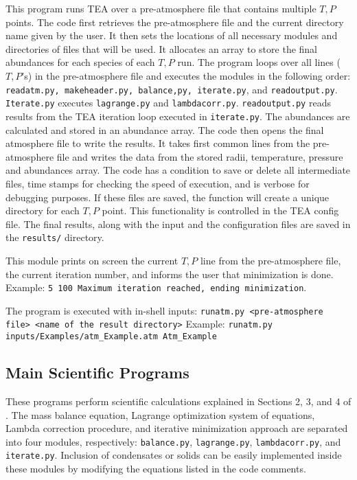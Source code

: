 This program runs TEA over a pre-atmosphere file that contains
multiple ${T,P}$ points.  The code first retrieves the pre-atmosphere
file and the current directory name given by the user. It then sets
the locations of all necessary modules and directories of files that
will be used. It allocates an array to store the final abundances for
each species of each $T, P$ run. The program loops over all lines
(${T, P}$'s) in the pre-atmosphere file and executes the modules in
the following order: \texttt{readatm.py, makeheader.py, balance,py,
iterate.py}, and \texttt{readoutput.py}. \texttt{Iterate.py}
executes \texttt{lagrange.py}
and \texttt{lambdacorr.py}. \texttt{readoutput.py} reads results from
the TEA iteration loop executed in \texttt{iterate.py}. The abundances
are calculated and stored in an abundance array. The code then opens
the final atmosphere file to write the results. It takes first common
lines from the pre-atmosphere file and writes the data from the stored
radii, temperature, pressure and abundances array. The code has a
condition to save or delete all intermediate files, time stamps for
checking the speed of execution, and is verbose for debugging
purposes. If these files are saved, the function will create a unique
directory for each ${T, P}$ point. This functionality is controlled in
the TEA config file. The final results, along with the input and the
configuration files are saved in the \texttt{results/} directory.

This module prints on screen the current ${T, P}$ line from the
pre-atmosphere file, the current iteration number, and informs the
user that minimization is done.  Example: \texttt{5 100 Maximum
iteration reached, ending minimization}.

The program is executed with in-shell inputs:\newline
\texttt{runatm.py <pre-atmosphere file> <name of the result directory>}\newline
Example: \texttt{runatm.py inputs/Examples/atm\_Example.atm
Atm\_Example}



\subsection{Main Scientific Programs}

These programs perform scientific calculations explained in Sections
2, 3, and 4 of \citet{BlecicEtal2015-TEAtheory}. The mass balance
equation, Lagrange optimization system of equations, Lambda correction
procedure, and iterative minimization approach are separated into four
modules,
respectively: \texttt{balance.py}, \texttt{lagrange.py}, \texttt{lambdacorr.py},
and \texttt{iterate.py}. Inclusion of condensates or solids can be
easily implemented inside these modules by modifying the equations
listed in the code comments.

